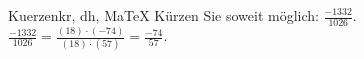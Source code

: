\begin{MAufgabe}{Kuerzen}{kr, dh, MaTeX}
K\"urzen Sie soweit m\"oglich: $\frac{-1332}{1026}$.\\ 
\ifLsg\MLoesung
\quad $\frac{-1332}{1026}=\frac{(18)\cdot(-74)}{(18)\cdot(57)}=\frac{-74}{57}$.\else\relax\fi
 \end{MAufgabe}